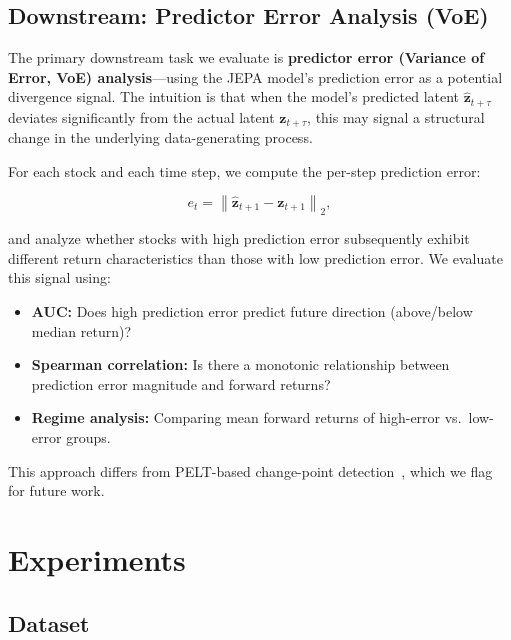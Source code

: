 \documentclass[11pt]{article}
\begin{document}
\subsection{Downstream: Predictor Error Analysis (VoE)}

The primary downstream task we evaluate is \textbf{predictor error (Variance of Error, VoE) analysis}---using the JEPA model's prediction error as a potential divergence signal. The intuition is that when the model's predicted latent $\hat{\mathbf{z}}_{t+\tau}$ deviates significantly from the actual latent $\mathbf{z}_{t+\tau}$, this may signal a structural change in the underlying data-generating process.

For each stock and each time step, we compute the per-step prediction error:

\begin{equation}
e_t = \left\| \hat{\mathbf{z}}_{t+1} - \mathbf{z}_{t+1} \right\|_2,
\label{eq:voe_error}
\end{equation}

and analyze whether stocks with high prediction error subsequently exhibit different return characteristics than those with low prediction error. We evaluate this signal using:

\begin{itemize}[nosep]
  \item \textbf{AUC:} Does high prediction error predict future direction (above/below median return)?
  \item \textbf{Spearman correlation:} Is there a monotonic relationship between prediction error magnitude and forward returns?
  \item \textbf{Regime analysis:} Comparing mean forward returns of high-error vs.\ low-error groups.
\end{itemize}

This approach differs from PELT-based change-point detection~\citep{killick2012pelt}, which we flag for future work.

\section{Experiments}

\subsection{Dataset}
\end{document}
